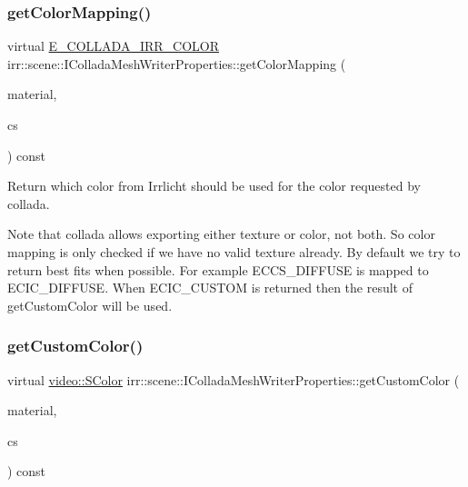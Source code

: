 \subsubsection{\texorpdfstring{get\+Color\+Mapping()}{getColorMapping()}\hspace{0.1cm}{\footnotesize\ttfamily [2/2]}}
{\footnotesize\ttfamily virtual \hyperlink{namespaceirr_1_1scene_a61cba210038d6d843b81d9282f1cac7e}{E\+\_\+\+C\+O\+L\+L\+A\+D\+A\+\_\+\+I\+R\+R\+\_\+\+C\+O\+L\+OR} irr\+::scene\+::\+I\+Collada\+Mesh\+Writer\+Properties\+::get\+Color\+Mapping (\begin{DoxyParamCaption}\item[{const \hyperlink{classirr_1_1video_1_1SMaterial}{video\+::\+S\+Material} \&}]{material,  }\item[{\hyperlink{namespaceirr_1_1scene_a6204218341c6b449d879cd8367b2f8d8}{E\+\_\+\+C\+O\+L\+L\+A\+D\+A\+\_\+\+C\+O\+L\+O\+R\+\_\+\+S\+A\+M\+P\+L\+ER}}]{cs }\end{DoxyParamCaption}) const\hspace{0.3cm}{\ttfamily [pure virtual]}}



Return which color from Irrlicht should be used for the color requested by collada. 

Note that collada allows exporting either texture or color, not both. So color mapping is only checked if we have no valid texture already. By default we try to return best fits when possible. For example E\+C\+C\+S\+\_\+\+D\+I\+F\+F\+U\+SE is mapped to E\+C\+I\+C\+\_\+\+D\+I\+F\+F\+U\+SE. When E\+C\+I\+C\+\_\+\+C\+U\+S\+T\+OM is returned then the result of get\+Custom\+Color will be used. \mbox{\label{classirr_1_1scene_1_1IColladaMeshWriterProperties_a8028af2323dab63df4bdfeb292ec48cd}} 
\subsubsection{\texorpdfstring{get\+Custom\+Color()}{getCustomColor()}\hspace{0.1cm}{\footnotesize\ttfamily [1/2]}}
{\footnotesize\ttfamily virtual \hyperlink{classirr_1_1video_1_1SColor}{video\+::\+S\+Color} irr\+::scene\+::\+I\+Collada\+Mesh\+Writer\+Properties\+::get\+Custom\+Color (\begin{DoxyParamCaption}\item[{const \hyperlink{classirr_1_1video_1_1SMaterial}{video\+::\+S\+Material} \&}]{material,  }\item[{\hyperlink{namespaceirr_1_1scene_a6204218341c6b449d879cd8367b2f8d8}{E\+\_\+\+C\+O\+L\+L\+A\+D\+A\+\_\+\+C\+O\+L\+O\+R\+\_\+\+S\+A\+M\+P\+L\+ER}}]{cs }\end{DoxyParamCaption}) const\hspace{0.3cm}{\ttfamily [pure virtual]}}



